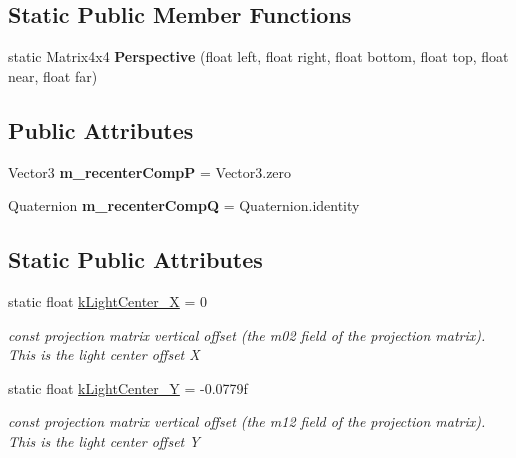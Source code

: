 \subsection*{Static Public Member Functions}
\begin{DoxyCompactItemize}
\item 
\mbox{\label{class_ximmerse_1_1_rhino_x_1_1_a_r_camera_a924a0d756c445884e15efabb10cd10bb}} 
static Matrix4x4 {\bfseries Perspective} (float left, float right, float bottom, float top, float near, float far)
\end{DoxyCompactItemize}
\subsection*{Public Attributes}
\begin{DoxyCompactItemize}
\item 
\mbox{\label{class_ximmerse_1_1_rhino_x_1_1_a_r_camera_a55c0080aa29097a34d1983755f32f73d}} 
Vector3 {\bfseries m\+\_\+recenter\+CompP} = Vector3.\+zero
\item 
\mbox{\label{class_ximmerse_1_1_rhino_x_1_1_a_r_camera_aa4a6340782612679e7010d0e28ad806d}} 
Quaternion {\bfseries m\+\_\+recenter\+CompQ} = Quaternion.\+identity
\end{DoxyCompactItemize}
\subsection*{Static Public Attributes}
\begin{DoxyCompactItemize}
\item 
static float \mbox{\hyperlink{class_ximmerse_1_1_rhino_x_1_1_a_r_camera_ae47108706cc7216eaa7dd50ffbef8851}{k\+Light\+Center\+\_\+X}} = 0
\begin{DoxyCompactList}\small\item\em const projection matrix vertical offset (the m02 field of the projection matrix). This is the light center offset X \end{DoxyCompactList}\item 
static float \mbox{\hyperlink{class_ximmerse_1_1_rhino_x_1_1_a_r_camera_a78a8ef179a5c613db4aae90a15aa1ffd}{k\+Light\+Center\+\_\+Y}} = -\/0.\+0779f
\begin{DoxyCompactList}\small\item\em const projection matrix vertical offset (the m12 field of the projection matrix). This is the light center offset Y \end{DoxyCompactList}\end{DoxyCompactItemize}
